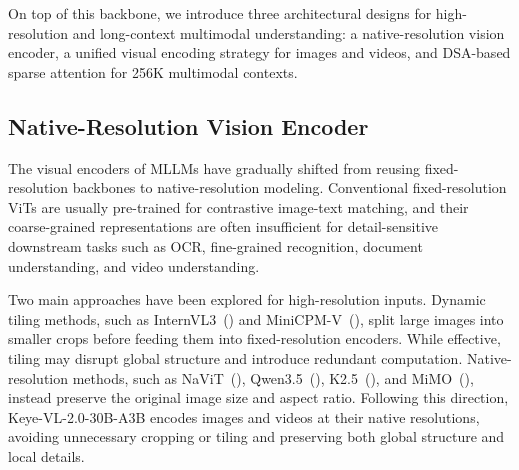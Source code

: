 \documentclass{article} %
\begin{document}
On top of this backbone, we introduce three architectural designs for high-resolution and long-context multimodal understanding: a native-resolution vision encoder, a unified visual encoding strategy for images and videos, and DSA-based sparse attention for 256K multimodal contexts.


\subsection{Native-Resolution Vision Encoder}

The visual encoders of MLLMs have gradually shifted from reusing fixed-resolution backbones to native-resolution modeling. Conventional fixed-resolution ViTs are usually pre-trained for contrastive image-text matching, and their coarse-grained representations are often insufficient for detail-sensitive downstream tasks such as OCR, fine-grained recognition, document understanding, and video understanding.

Two main approaches have been explored for high-resolution inputs. Dynamic tiling methods, such as InternVL3~(\cite{internvl3}) and MiniCPM-V~(\cite{minicpm_v}), split large images into smaller crops before feeding them into fixed-resolution encoders. While effective, tiling may disrupt global structure and introduce redundant computation. Native-resolution methods, such as NaViT~(\cite{navit}), Qwen3.5~(\cite{qwen3.5}), K2.5~(\cite{team2026kimi}), and MiMO~(\cite{mimoteam2026v2flash}), instead preserve the original image size and aspect ratio. Following this direction, Keye-VL-2.0-30B-A3B encodes images and videos at their native resolutions, avoiding unnecessary cropping or tiling and preserving both global structure and local details.
\end{document}
